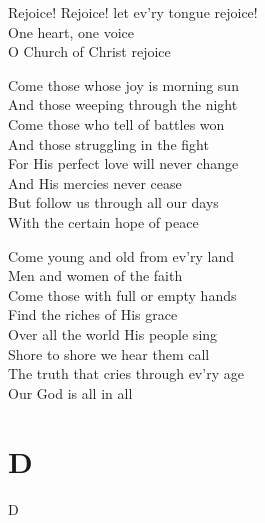 \documentclass{beamer}
\begin{document}
{\begin{frame}{}
Rejoice! Rejoice! let ev'ry tongue rejoice!\\ 
One heart, one voice\\ 
O Church of Christ rejoice 

\end{frame}

\hypertarget{Come, people of the Risen King[]2}{}
\begin{frame}{}
\fontsize{ 18 }{ 23 }\selectfont

Come those whose joy is morning sun\\ 
And those weeping through the night\\ 
Come those who tell of battles won\\ 
And those struggling in the fight\\ 
For His perfect love will never change\\ 
And His mercies never cease\\ 
But follow us through all our days\\ 
With the certain hope of peace 

\end{frame}

\hypertarget{Come, people of the Risen King[]3}{}
\begin{frame}{}
\fontsize{ 18 }{ 23 }\selectfont

Come young and old from ev'ry land\\ 
Men and women of the faith\\ 
Come those with full or empty hands\\ 
Find the riches of His grace\\ 
Over all the world His people sing\\ 
Shore to shore we hear them call\\ 
The truth that cries through ev'ry age\\ 
Our God is all in all 

\end{frame}

}
\section{D}

\begin{frame}{D}
\begin{columns}

    


    


\end{columns}

\end{frame}
\end{document}

